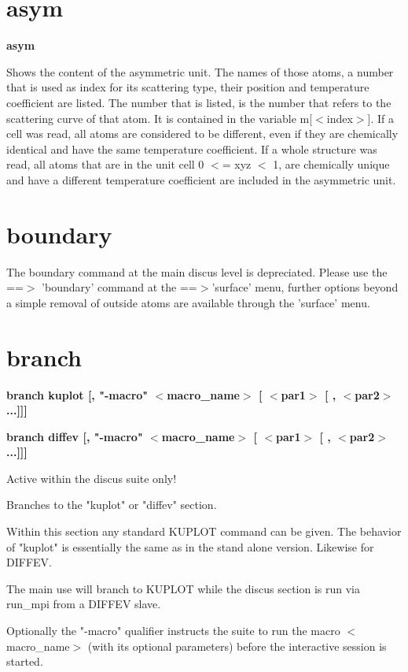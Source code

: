 \section{asym}
{\bf asym \par }
\par
\vspace{3pt}
Shows the content of the asymmetric unit. The names of those atoms, 
a number that is used as index for its scattering type, their position 
and temperature coefficient are listed. The number that is listed, 
is the number that refers to the scattering curve of that atom. It is 
contained in the variable m[$ <$index$> $]. If a cell was read, all atoms 
are considered to be different, even if they are chemically identical 
and have the same temperature coefficient. If a whole structure was 
read, all atoms that are in the unit cell 0 $ <$= xyz $ <$ 1, are chemically 
unique and have a different temperature coefficient are included in 
the asymmetric unit. 
\section{boundary}
\par
The boundary command at the main discus level is depreciated. 
Please use the ==$> $ 'boundary' command at the ==$> $'surface' menu, 
further options beyond a simple removal of outside atoms are available 
through the 'surface' menu. 
\section{branch}
{\bf branch kuplot [, "-macro" $ <$macro\_name$> $ [ $ <$par1$> $ [ , $ <$par2$> $ ...]]] \par }
{\bf branch diffev [, "-macro" $ <$macro\_name$> $ [ $ <$par1$> $ [ , $ <$par2$> $ ...]]] \par }
\par
\vspace{3pt}
Active within the discus suite only! 
\par
Branches to the "kuplot" or "diffev" section. 
\par
Within this section any standard KUPLOT command can be 
given. The behavior of "kuplot" is essentially the same 
as in the stand alone version. Likewise for DIFFEV. 
\par
The main use will branch to KUPLOT while the discus section 
is run via run\_mpi from a DIFFEV slave. 
\par
Optionally the "-macro" qualifier instructs the suite to run the 
macro $ <$macro\_name$> $ (with its optional parameters) before the 
interactive session is started. 
